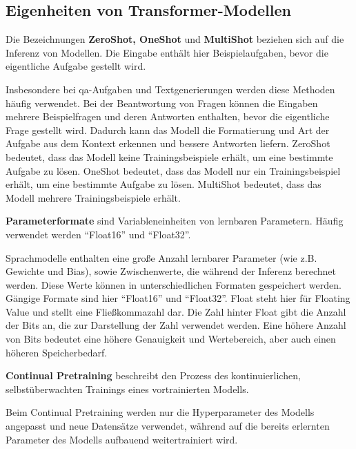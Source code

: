 \subsection{Eigenheiten von Transformer-Modellen}
\begin{definition}\label{def:zeroshot-oneshot-multishot}
    Die Bezeichnungen \textbf{ZeroShot, OneShot} und \textbf{MultiShot} beziehen sich auf die Inferenz von Modellen.
    Die Eingabe enthält hier Beispielaufgaben, bevor die eigentliche Aufgabe gestellt wird.
\end{definition}
Insbesondere bei \ac{qa}-Aufgaben und Textgenerierungen werden diese Methoden häufig verwendet.
Bei der Beantwortung von Fragen können die Eingaben mehrere Beispielfragen und deren Antworten enthalten, bevor die eigentliche Frage gestellt wird.
Dadurch kann das Modell die Formatierung und Art der Aufgabe aus dem Kontext erkennen und bessere Antworten liefern.
\mbox{ZeroShot} bedeutet, dass das Modell keine Trainingsbeispiele erhält, um eine bestimmte Aufgabe zu lösen.
OneShot bedeutet, dass das Modell nur ein Trainingsbeispiel erhält, um eine bestimmte Aufgabe zu lösen.
MultiShot bedeutet, dass das Modell mehrere Trainingsbeispiele erhält.


\begin{definition}\label{def:parameterformate}
    \textbf{Parameterformate} sind Variableneinheiten von lernbaren Parametern.
    Häufig verwendet werden \enquote{Float16} und \enquote{Float32}.
\end{definition}
Sprachmodelle enthalten eine große Anzahl lernbarer Parameter (wie z.B. Gewichte und Bias),
sowie Zwischenwerte, die während der Inferenz berechnet werden.
Diese Werte können in unterschiedlichen Formaten gespeichert werden.
Gängige Formate sind hier \enquote{Float16} und \enquote{Float32}.
Float steht hier für Floating Value und stellt eine Fließkommazahl dar.
Die Zahl hinter Float gibt die Anzahl der Bits an, die zur Darstellung der Zahl verwendet werden.
Eine höhere Anzahl von Bits bedeutet eine höhere Genauigkeit und Wertebereich, aber auch einen höheren Speicherbedarf.

\begin{definition}\label{def:continual-pretraining}
    \textbf{Continual Pretraining} beschreibt den Prozess des kontinuierlichen, selbstüberwachten Trainings eines vortrainierten Modells.
\end{definition}
Beim Continual Pretraining werden nur die Hyperparameter des Modells angepasst und neue Datensätze verwendet, während auf die bereits erlernten Parameter des Modells aufbauend weitertrainiert wird.

